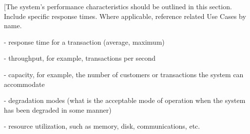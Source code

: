 [The system’s performance characteristics should 
be outlined in this section. Include specific 
response times. Where applicable, reference 
related Use Cases by name.

- response time for a transaction (average, maximum)

- throughput, for example, transactions per second

- capacity, for example, the number of customers or 
  transactions the system can accommodate

- degradation modes (what is the acceptable mode 
  of operation when the system has been degraded 
  in some manner)

- resource utilization, such as memory, disk, 
  communications, etc.
  